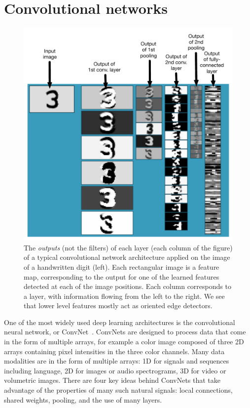 \documentclass[10pts]{article}
\begin{document}
\section{Convolutional networks}


\begin{figure}
\begin{center}
  \vspace{0.2cm}
  \includegraphics[width=0.70\linewidth]{convnet-diagram-labeled}
\end{center}
\vspace{-0.6cm}
\caption{The {\em outputs} (not the filters) of each layer (each column of the figure) 
of a typical convolutional network architecture
applied on the image of a handwritten digit (left). Each rectangular
image is a feature map, corresponding to the output for one of the learned features 
detected at each of the image positions.
Each column corresponds to a layer, with information flowing from the left to
the right. We see that lower level features mostly act as oriented edge detectors.
}
\label{fig:convnet}
\end{figure}

One of the most widely used deep learning architectures is the
convolutional neural network, or
ConvNet~\cite{lecun-90c,lecun-98}. ConvNets are designed to process
data that come in the form of multiple arrays, for example a color
image composed of three 2D arrays containing pixel intensities in the
three color channels. Many data modalities are in the form of multiple
arrays: 1D for signals and sequences including language, 2D for images
or audio spectrograms, 3D for video or volumetric images.  There are
four key ideas behind ConvNets that take advantage of the properties
of many such natural signals: local connections, shared weights,
pooling, and the use of many layers.
\end{document}

